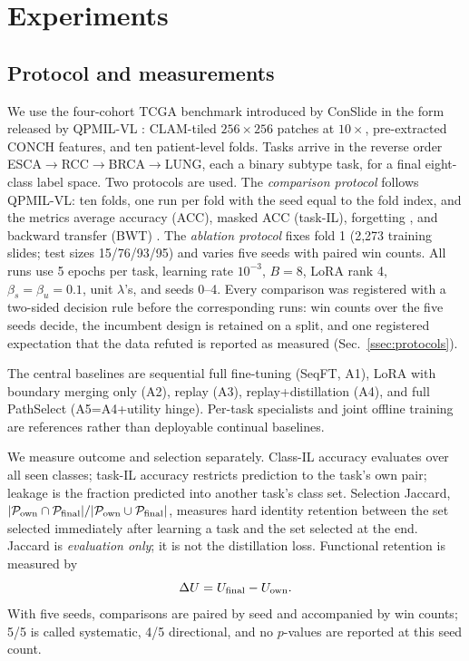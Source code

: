 \documentclass{article}
\newcommand{\Psel}{\mathcal{P}}
\begin{document}
\section{Experiments}
\label{sec:exp}

\subsection{Protocol and measurements}

We use the four-cohort TCGA benchmark introduced by ConSlide \cite{huang2023conslide} in the form released by QPMIL-VL \cite{gou2025qpmil}: CLAM-tiled $256\times256$ patches at $10\times$, pre-extracted CONCH features, and ten patient-level folds. Tasks arrive in the reverse order ESCA$\rightarrow$RCC$\rightarrow$BRCA$\rightarrow$LUNG, each a binary subtype task, for a final eight-class label space. Two protocols are used. The \emph{comparison protocol} follows QPMIL-VL: ten folds, one run per fold with the seed equal to the fold index, and the metrics average accuracy (ACC), masked ACC (task-IL), forgetting \cite{chaudhry2018rwalk}, and backward transfer (BWT) \cite{lopezpaz2017gem}. The \emph{ablation protocol} fixes fold 1 (2,273 training slides; test sizes 15/76/93/95) and varies five seeds with paired win counts.
All runs use 5 epochs per task, learning rate $10^{-3}$, $B=8$, LoRA rank 4, $\beta_s{=}\beta_u{=}0.1$, unit $\lambda$'s, and seeds 0--4. Every comparison was registered with a two-sided decision rule before the corresponding runs: win counts over the five seeds decide, the incumbent design is retained on a split, and one registered expectation that the data refuted is reported as measured (Sec.~\ref{ssec:protocols}).

The central baselines are sequential full fine-tuning (SeqFT, A1), LoRA with boundary merging only (A2), replay (A3), replay+distillation (A4), and full PathSelect (A5=A4+utility hinge).
Per-task specialists and joint offline training are references rather than deployable continual baselines.

We measure outcome and selection separately.
Class-IL accuracy evaluates over all seen classes; task-IL accuracy restricts prediction to the task's own pair; leakage is the fraction predicted into another task's class set.
Selection Jaccard, $|\Psel_{\rm own}\cap\Psel_{\rm final}|/|\Psel_{\rm own}\cup\Psel_{\rm final}|$, measures hard identity retention between the set selected immediately after learning a task and the set selected at the end.
Jaccard is \emph{evaluation only}; it is not the distillation loss.
Functional retention is measured by
\[
\Delta U=U_{\rm final}-U_{\rm own}.
\]
With five seeds, comparisons are paired by seed and accompanied by win counts; 5/5 is called systematic, 4/5 directional, and no $p$-values are reported at this seed count.
\end{document}
